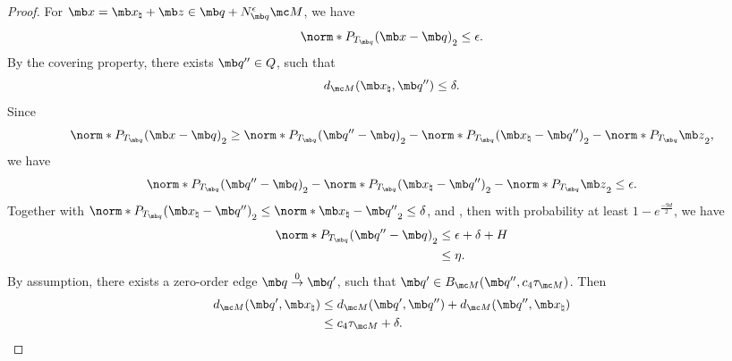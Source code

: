 {\begin{proof}
    For $\mb x = \mb x_\natural + \mb z \in \mb q+N_{\mb q}^{\epsilon} \mc M$, we have
    \begin{equation}
        \norm*{P_{T_{\mb q}}(\mb x - \mb q)}_2 \leq \epsilon.
    \end{equation}
By the covering property, there exists $\mb q'' \in Q$, such that
\begin{equation}
    d_{\mc M}(\mb x_\natural, \mb q'') \leq \delta. 
\end{equation}
Since
    \begin{equation}
        \norm*{P_{T_{\mb q}}(\mb x - \mb q)}_2 
        \geq \norm*{P_{T_{\mb q}}(\mb q'' - \mb q)}_2 - \norm*{P_{T_{\mb q}}(\mb x_\natural - \mb q'')}_2 - \norm*{P_{T_{\mb q}}\mb z}_2,
    \end{equation}
 we have
\begin{equation}
    \norm*{P_{T_{\mb q}}(\mb q'' - \mb q)}_2 - \norm*{P_{T_{\mb q}}(\mb x_\natural - \mb q'')}_2 - \norm*{P_{T_{\mb q}}\mb z}_2
    \leq \epsilon.
\end{equation}
Together with $\norm*{P_{T_{\mb q}}(\mb x_\natural - \mb q'')}_2 \leq \norm*{\mb x_\natural - \mb q''}_2 \leq \delta$, and , then with probability at least $1-e^{\frac{-9d}{2}}$, we have
\begin{equation}
    \begin{aligned}
    \norm*{P_{T_{\mb q}}(\mb q'' - \mb q)}_2
    &\leq \epsilon + \delta + H\\
    &\leq \eta.
    \end{aligned}
\end{equation}
By assumption, there exists a zero-order edge $\mb q \overset{0}{\rightarrow} \mb q'$, such that $\mb q' \in B_{\mc M}(\mb q'', c_4\tau_{\mc M})$. Then
\begin{equation}
    \begin{aligned}
        d_{\mc M}(\mb q', \mb x_\natural)
        &\leq d_{\mc M}(\mb q', \mb q'') + d_{\mc M}(\mb q'', \mb x_\natural)\\
        &\leq c_4 \tau_{\mc M} + \delta.
    \end{aligned}
\end{equation}
\end{proof}
}


